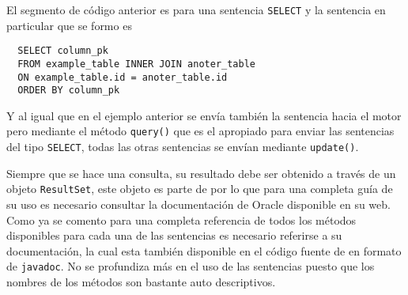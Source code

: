 %
El segmento de código anterior es para una sentencia \verb=SELECT= y la sentencia en particular que se formo es
\begin{Verbatim}
  SELECT column_pk
  FROM example_table INNER JOIN anoter_table
  ON example_table.id = anoter_table.id
  ORDER BY column_pk
\end{Verbatim}
Y al igual que en el ejemplo anterior se envía también la sentencia hacia el motor pero mediante el método \verb=query()= que es el apropiado para enviar las sentencias del tipo \verb=SELECT=, todas las otras sentencias se envían mediante \verb=update()=.

Siempre que se hace una consulta, su resultado debe ser obtenido a través de un objeto \verb=ResultSet=, este objeto es parte de \jd por lo que para una completa guía de su uso es necesario consultar la documentación\citep{java:jdbc:tutorial} de Oracle disponible en su web. Como ya se comento para una completa referencia de todos los métodos disponibles para cada una de las sentencias es necesario referirse a su documentación, la cual esta también disponible en  el código fuente de \jj en formato de \verb=javadoc=. No se profundiza más en el uso de las sentencias puesto que los nombres de los métodos son bastante auto descriptivos.
%
